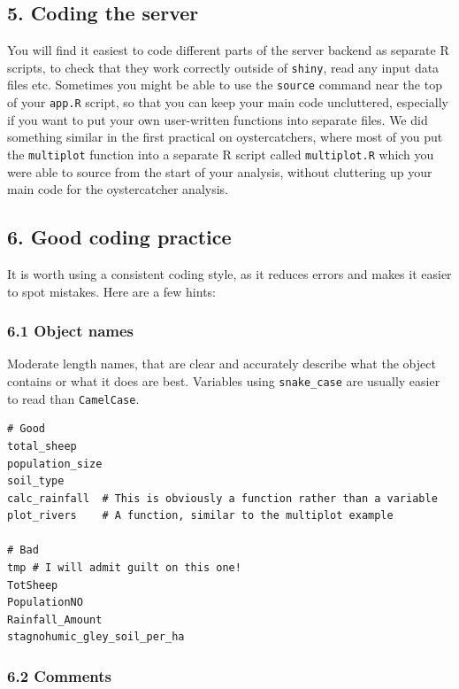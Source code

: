 \documentclass[]{article}
\begin{document}
\subsection{5. Coding the server}\label{coding-the-server}

You will find it easiest to code different parts of the server backend
as separate R scripts, to check that they work correctly outside of
\texttt{shiny}, read any input data files etc. Sometimes you might be
able to use the \texttt{source} command near the top of your
\texttt{app.R} script, so that you can keep your main code uncluttered,
especially if you want to put your own user-written functions into
separate files. We did something similar in the first practical on
oystercatchers, where most of you put the \texttt{multiplot} function
into a separate R script called \texttt{multiplot.R} which you were able
to source from the start of your analysis, without cluttering up your
main code for the oystercatcher analysis.

\subsection{6. Good coding practice}\label{good-coding-practice}

It is worth using a consistent coding style, as it reduces errors and
makes it easier to spot mistakes. Here are a few hints:

\subsubsection{6.1 Object names}\label{object-names}

Moderate length names, that are clear and accurately describe what the
object contains or what it does are best. Variables using
\texttt{snake\_case} are usually easier to read than \texttt{CamelCase}.

\begin{verbatim}
# Good
total_sheep
population_size
soil_type
calc_rainfall  # This is obviously a function rather than a variable
plot_rivers    # A function, similar to the multiplot example

# Bad
tmp # I will admit guilt on this one!
TotSheep
PopulationNO
Rainfall_Amount
stagnohumic_gley_soil_per_ha
\end{verbatim}

\subsubsection{6.2 Comments}\label{comments}
\end{document}
